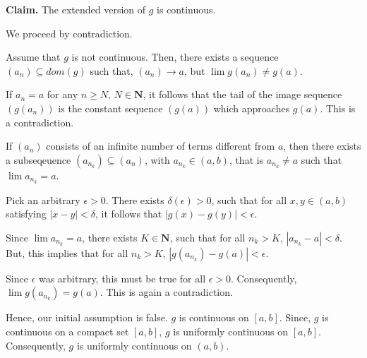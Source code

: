 \documentclass[10pt]{article}
\begin{document}
\textbf{Claim.} The extended version of $\displaystyle g$ is continuous.



We proceed by contradiction. 



Assume that $\displaystyle g$ is not continuous. Then, there exists a sequence $\displaystyle ( a_{n}) \subseteq dom( g)$ such that, $\displaystyle ( a_{n})\rightarrow a$, but $\displaystyle \lim g( a_{n}) \neq g( a)$.



If $\displaystyle a_{n} =a$ for any $\displaystyle n\geq N$, $\displaystyle N\in \mathbf{N}$, it follows that the tail of the image sequence $\displaystyle ( g( a_{n}))$ is the constant sequence $\displaystyle ( g( a))$ which approaches $\displaystyle g( a)$. This is a contradiction.



If $\displaystyle ( a_{n})$ consists of an infinite number of terms different from $\displaystyle a$, then there exists a subseqeuence $\displaystyle ( a_{n_{k}}) \subseteq ( a_{n})$, with $\displaystyle a_{n_{k}} \in ( a,b)$, that is $\displaystyle a_{n_{k}} \neq a$ such that $\displaystyle \lim a_{n_{k}} =a$. 



Pick an arbitrary $\displaystyle \epsilon  >0$. There exists $\displaystyle \delta ( \epsilon )  >0$, such that for all $\displaystyle x,y\in ( a,b)$ satisfying $\displaystyle |x-y|< \delta $, it follows that $\displaystyle |g( x) -g( y) |< \epsilon $.



Since $\displaystyle \lim a_{n_{k}} =a$, there exists $\displaystyle K\in \mathbf{N}$, such that for all $\displaystyle n_{k}  >K$, $\displaystyle |a_{n_{k}} -a|< \delta $. But, this implies that for all $\displaystyle n_{k}  >K$, $\displaystyle |g( a_{n_{k}}) -g( a) |< \epsilon $. 



Since $\displaystyle \epsilon $ was arbitrary, this must be true for all $\displaystyle \epsilon  >0$. Consequently, $\displaystyle \lim g( a_{n_{k}}) =g( a)$. This is again a contradiction.



Hence, our initial assumption is false. $\displaystyle g$ is continuous on $\displaystyle [ a,b]$. Since, $\displaystyle g$ is continuous on a compact set $\displaystyle [ a,b]$, $\displaystyle g$ is uniformly continuous on $\displaystyle [ a,b]$. Consequently, $\displaystyle g$ is uniformly continuous on $\displaystyle ( a,b)$.
\end{document}

